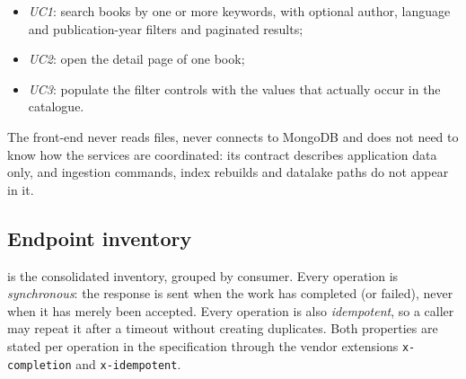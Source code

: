 \documentclass[10pt,a4paper]{article}
\newcommand{\code}[1]{\texttt{#1}}
\begin{document}
\begin{itemize}
  \item \emph{UC1}: search books by one or more keywords, with optional author,
  language and publication-year filters and paginated results;
  \item \emph{UC2}: open the detail page of one book;
  \item \emph{UC3}: populate the filter controls with the values that actually
  occur in the catalogue.
\end{itemize}

The front-end never reads files, never connects to MongoDB and does not need
to know how the services are coordinated: its contract describes application
data only, and ingestion commands, index rebuilds and datalake paths do not
appear in it.

\subsection{Endpoint inventory}
\label{sec:inventory}

 is the consolidated inventory, grouped by consumer. Every
operation is \emph{synchronous}: the response is sent when the work has
completed (or failed), never when it has merely been accepted. Every operation
is also \emph{idempotent}, so a caller may repeat it after a timeout without
creating duplicates. Both properties are stated per operation in the
specification through the vendor extensions \code{x-completion} and
\code{x-idempotent}.
\end{document}
